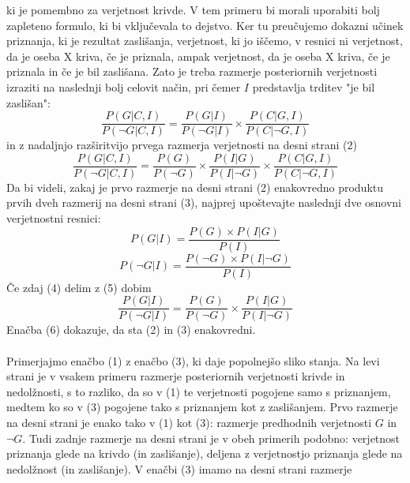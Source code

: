 \documentclass[12pt,a4paper]{amsart}
\theoremstyle{definition} %
\theoremstyle{plain} %
\begin{document}
ki je pomembno za verjetnost krivde. V tem primeru bi morali uporabiti bolj zapleteno formulo, ki bi vključevala to dejstvo. Ker tu preučujemo 
dokazni učinek priznanja, ki je rezultat zaslišanja, verjetnost, ki jo iščemo, v resnici ni verjetnost, da je oseba X kriva, če je priznala, 
ampak verjetnost, da je oseba X kriva, če je priznala in če je bil zaslišana. Zato je treba razmerje posteriornih verjetnosti izraziti na 
naslednji bolj celovit način, pri čemer $I$ predstavlja trditev "je bil zaslišan":
\begin{equation}
    \frac{P(G \lvert C, I)}{P(\neg G \lvert C, I)} = \frac{P(G \lvert I)}{P(\neg G \lvert I)}  \times \frac{P(C \lvert G, I)}{P(C \lvert \neg G, I)}
\end{equation}
in z nadaljnjo razširitvijo prvega razmerja verjetnosti na desni strani (2)
\begin{equation}
    \frac{P(G \lvert C, I)}{P(\neg G \lvert C, I)} = \frac{P(G)}{P(\neg G)} \times \frac{P(I \lvert G)}{P(I \lvert \neg G)}  \times \frac{P(C \lvert G, I)}{P(C \lvert \neg G, I)}
\end{equation}
Da bi videli, zakaj je prvo razmerje na desni strani (2) enakovredno produktu prvih dveh razmerij na desni strani (3), najprej upoštevajte naslednji dve osnovni verjetnostni resnici:
\begin{equation}
    P(G \lvert I) = \frac{P(G) \times P(I \lvert G)}{P(I)}
\end{equation}
\begin{equation}
    P(\neg G \lvert I) = \frac{P(\neg G) \times P(I \lvert \neg G)}{P(I)}
\end{equation}
Če zdaj (4) delim z (5) dobim
\begin{equation}
    \frac{P(G \lvert I)}{P(\neg G \lvert I)} = \frac{P(G)}{P(\neg G)}  \times \frac{P(I \lvert G)}{P(I \lvert \neg G)}
\end{equation}
Enačba (6) dokazuje, da sta (2) in (3) enakovredni.\\\\
Primerjajmo enačbo (1) z enačbo (3), ki daje popolnejšo sliko stanja. Na levi strani je v vsakem primeru razmerje posteriornih verjetnosti krivde in nedolžnosti, s to 
razliko, da so v (1) te verjetnosti pogojene samo s priznanjem, medtem ko so v (3) pogojene tako s priznanjem kot z zaslišanjem. Prvo razmerje na desni strani je enako 
tako v (1) kot (3): razmerje predhodnih verjetnosti $G$ in $\neg G$. Tudi zadnje razmerje na desni strani je v obeh primerih podobno: verjetnost priznanja glede na 
krivdo (in zaslišanje), deljena z verjetnostjo priznanja glede na nedolžnost (in zaslišanje). V enačbi (3) imamo na desni strani razmerje 
\end{document}
